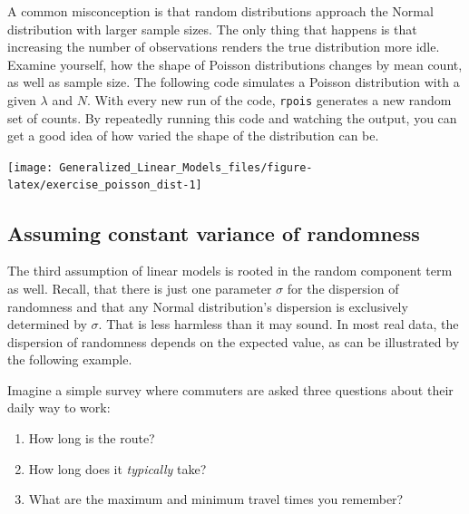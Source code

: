 \documentclass[]{svmono}
\newenvironment{Shaded}{\begin{snugshade}}{\end{snugshade}}
\newcommand{\KeywordTok}[1]{\textcolor[rgb]{0.13,0.29,0.53}{\textbf{#1}}}
\newcommand{\DataTypeTok}[1]{\textcolor[rgb]{0.13,0.29,0.53}{#1}}
\newcommand{\DecValTok}[1]{\textcolor[rgb]{0.00,0.00,0.81}{#1}}
\newcommand{\StringTok}[1]{\textcolor[rgb]{0.31,0.60,0.02}{#1}}
\newcommand{\OperatorTok}[1]{\textcolor[rgb]{0.81,0.36,0.00}{\textbf{#1}}}
\newcommand{\NormalTok}[1]{#1}
\providecommand{\tightlist}{%
  \setlength{\itemsep}{0pt}\setlength{\parskip}{0pt}}
\begin{document}
A common misconception is that random distributions approach the Normal
distribution with larger sample sizes. The only thing that happens is
that increasing the number of observations renders the true distribution
more idle. Examine yourself, how the shape of Poisson distributions
changes by mean count, as well as sample size. The following code
simulates a Poisson distribution with a given \(\lambda\) and \(N\).
With every new run of the code, \texttt{rpois} generates a new random
set of counts. By repeatedly running this code and watching the output,
you can get a good idea of how varied the shape of the distribution can
be.

\begin{Shaded}
\end{Shaded}

\texttt{[image: Generalized\_Linear\_Models\_files/figure-latex/exercise\_poisson\_dist-1]}

\subsection{Assuming constant variance of
randomness}\label{assume-constant-variance}

The third assumption of linear models is rooted in the random component
term as well. Recall, that there is just one parameter \(\sigma\) for
the dispersion of randomness and that any Normal distribution's
dispersion is exclusively determined by \(\sigma\). That is less
harmless than it may sound. In most real data, the dispersion of
randomness depends on the expected value, as can be illustrated by the
following example.

Imagine a simple survey where commuters are asked three questions about
their daily way to work:

\begin{enumerate}
\def\labelenumi{\arabic{enumi}.}
\tightlist
\item
  How long is the route?
\item
  How long does it \emph{typically} take?
\item
  What are the maximum and minimum travel times you remember?
\end{enumerate}
\end{document}
